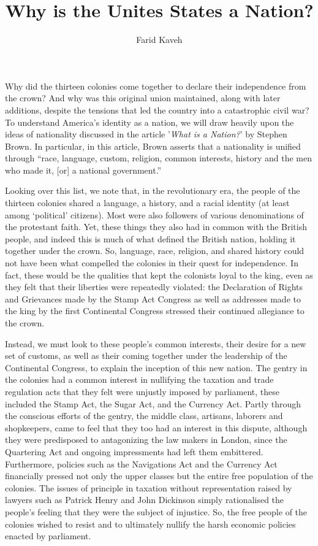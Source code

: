 \documentclass[a4paper]{article}
\begin{document}
\title{Why is the Unites States a Nation?}
\subtitle{}
\author{Farid Kaveh}

\maketitle

Why did the thirteen colonies come together to declare their independence from the crown? And why was this original union maintained, along with later additions, despite the tensions that led the country into a catastrophic civil war? To understand America’s identity as a nation, we will draw heavily upon the ideas of nationality discussed in the article '\textit{What is a Nation?}' by Stephen Brown. In particular, in this article, Brown asserts that a nationality is unified through “race, language, custom, religion, common interests, history and the men who made it, [or] a national government.” \autocite[]{10.2307/30083977} 

Looking over this list, we note that, in the revolutionary era, the people of the thirteen colonies shared a language, a history, and a racial identity (at least among ‘political’ citizens). Most were also followers of various denominations of the protestant faith. Yet, these things they also had in common with the British people, and indeed this is much of what defined the British nation, holding it together under the crown. So, language, race, religion, and shared history could not have been what compelled the colonies in their quest for independence. In fact, these would be the qualities that kept the colonists loyal to the king, even as they felt that their liberties were repeatedly violated: the Declaration of Rights and Grievances made by the Stamp Act Congress as well as addresses made to the king by the first Continental Congress stressed their continued allegiance to the crown. \autocite[pp. 172-173, 158-159]{AmericanRep1} 

Instead, we must look to these people’s common interests, their desire for a new set of customs, as well as their coming together under the leadership of the Continental Congress, to explain the inception of this new nation. The gentry in the colonies had a common interest in nullifying the taxation and trade regulation acts that they felt were unjustly imposed by parliament, these included the Stamp Act, the Sugar Act, and the Currency Act.\autocite[pp. 158-160]{AmericanRep1} Partly through the conscious efforts of the gentry, the middle class, artisans, laborers and shopkeepers, came to feel  that they too had an interest in this dispute, although they were predisposed to antagonizing the law makers in London, since the Quartering Act and ongoing impressments had left them embittered. Furthermore, policies such as the Navigations Act and the Currency Act financially pressed not only the upper classes but the entire free population of the colonies. The issues of principle in taxation without representation raised by lawyers such as Patrick Henry and John Dickinson simply rationalised the people’s feeling that they were the subject of injustice. So, the free people of the colonies wished to resist and to ultimately nullify the harsh economic policies enacted by parliament.  
\end{document}
